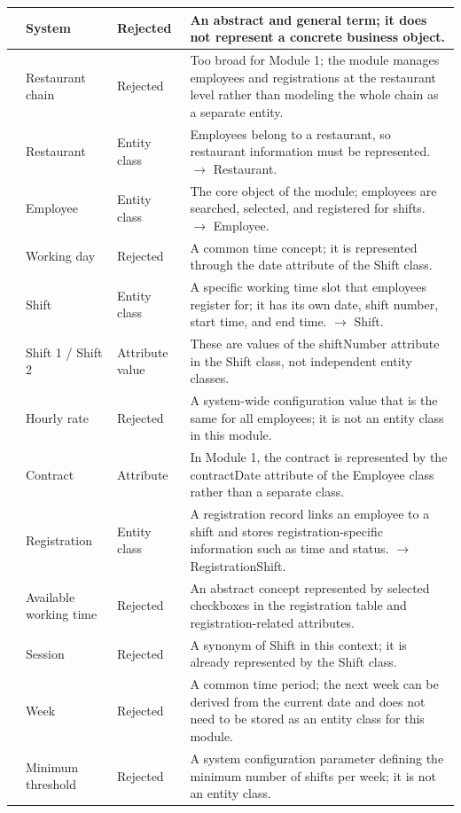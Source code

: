 \begin{longtable}{|>{\centering\arraybackslash}p{0.8cm}|p{3.1cm}|p{3.2cm}|p{8.0cm}|}
1 & System & Rejected & An abstract and general term; it does not represent a concrete business object. \\
\hline
2 & Restaurant chain & Rejected & Too broad for Module 1; the module manages employees and registrations at the restaurant level rather than modeling the whole chain as a separate entity. \\
\hline
3 & Restaurant & Entity class & Employees belong to a restaurant, so restaurant information must be represented. $\rightarrow$ Restaurant. \\
\hline
4 & Employee & Entity class & The core object of the module; employees are searched, selected, and registered for shifts. $\rightarrow$ Employee. \\
\hline
5 & Working day & Rejected & A common time concept; it is represented through the date attribute of the Shift class. \\
\hline
6 & Shift & Entity class & A specific working time slot that employees register for; it has its own date, shift number, start time, and end time. $\rightarrow$ Shift. \\
\hline
7 & Shift 1 / Shift 2 & Attribute value & These are values of the shiftNumber attribute in the Shift class, not independent entity classes. \\
\hline
8 & Hourly rate & Rejected  & A system-wide configuration value that is the same for all employees; it is not an entity class in this module. \\
\hline
9 & Contract & Attribute & In Module 1, the contract is represented by the contractDate attribute of the Employee class rather than a separate class. \\
\hline
10 & Registration & Entity class & A registration record links an employee to a shift and stores registration-specific information such as time and status. $\rightarrow$ RegistrationShift. \\
\hline
11 & Available working time & Rejected & An abstract concept represented by selected checkboxes in the registration table and registration-related attributes. \\
\hline
12 & Session & Rejected & A synonym of Shift in this context; it is already represented by the Shift class. \\
\hline
13 & Week & Rejected & A common time period; the next week can be derived from the current date and does not need to be stored as an entity class for this module. \\
\hline
14 & Minimum threshold & Rejected  & A system configuration parameter defining the minimum number of shifts per week; it is not an entity class. \\

\end{longtable}
